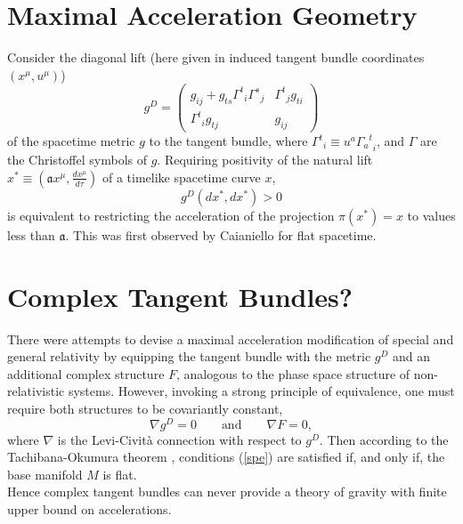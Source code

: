 \documentclass[11pt,a4paper,twoside]{article}
\begin{document}
\section{Maximal Acceleration Geometry}
Consider the diagonal lift \cite{Yano1973} (here given in induced
tangent bundle coordinates $(x^\mu,u^\mu)$)
\begin{equation}
  g^D = \left(\begin{array}{cc} g_{ij} + g_{ts} {\Gamma^t}_i
  {\Gamma^s}_j
  & {\Gamma^t}_j g_{ti} \\ {\Gamma^t}_i g_{tj} & g_{ij}
  \end{array}\right)
\end{equation}
of the spacetime metric $g$ to the tangent bundle, where ${\Gamma^t}_i
\equiv u^a {{\Gamma_a}^t}_i$, and $\Gamma$ are the Christoffel symbols of $g$.
Requiring positivity
of the natural lift \cite{Yano1973} $x^* \equiv
\left(\mathfrak{a} x^\mu, \frac{dx^\mu}{d\tau}\right)$ of a timelike
spacetime curve $x$,
\begin{equation}
  g^D(dx^*,dx^*) > 0
\end{equation}
is equivalent to restricting the acceleration of the projection
$\pi(x^*)=x$ to values less than $\mathfrak{a}$. This was first
observed by Caianiello \cite{Caianiello1981} for flat spacetime.

\section{Complex Tangent Bundles?}
There were attempts \cite{Low,Brandt} to devise a maximal acceleration modification of
special and general relativity by equipping the tangent bundle with
the metric $g^D$ and an additional complex structure $F$, analogous to
the phase space structure of non-relativistic systems. However, invoking a
strong principle of equivalence, one must require both
structures to be covariantly constant,
\begin{equation}\label{spe}
  \nabla g^D = 0 \qquad \textrm{and} \qquad \nabla F = 0,
\end{equation}
where $\nabla$ is the Levi-Civit\`a connection with respect to $g^D$.
Then according to the Tachibana-Okumura theorem \cite{TO1962}, conditions
(\ref{spe}) are satisfied if, and only if, the base manifold $M$ is
flat.\\
Hence complex tangent bundles can never provide a theory of
gravity with finite upper bound on accelerations.\\
\end{document}
